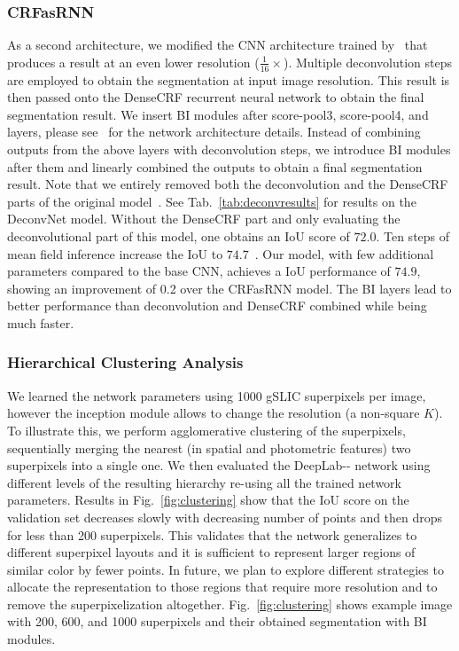\subsubsection{CRFasRNN}
As a second architecture, we modified the CNN architecture
trained by~\cite{zheng2015conditional} that
produces a result at an even lower resolution ($\frac{1}{16} \times$).
Multiple deconvolution steps are employed to obtain the segmentation at input
image resolution. This result is then passed onto the DenseCRF recurrent neural network
to obtain the final segmentation result.
We insert BI modules after score-pool3, score-pool4,  and  layers, please
see~\cite{long2014fully,zheng2015conditional} for the network architecture details.
Instead of combining outputs from the above layers with deconvolution steps, we introduce
BI modules after them and linearly combined the outputs to obtain a final segmentation result.
Note that we entirely removed both the deconvolution and the DenseCRF parts of the original model~\cite{zheng2015conditional}.
See Tab.~\ref{tab:deconvresults} for results on the DeconvNet model.
Without the DenseCRF part and only evaluating the deconvolutional part of this
model, one obtains an IoU score of $72.0$.
Ten steps of mean field inference increase the IoU to $74.7$~\cite{zheng2015conditional}. Our model, with few additional parameters compared to the base CNN,
achieves a IoU performance of $74.9$, showing an improvement of 0.2 over the CRFasRNN model.
The BI layers lead to better performance than deconvolution and DenseCRF combined while being much faster.

\subsubsection{Hierarchical Clustering Analysis}
We learned the network parameters using 1000 gSLIC superpixels per image, however the inception module allows to change the resolution (a non-square $K$).
To illustrate this, we perform agglomerative clustering of the superpixels, sequentially merging the nearest (in spatial and
photometric features) two superpixels into a single one.
We then evaluated the DeepLab-- network using different levels of the resulting hierarchy re-using all the trained network parameters.
Results in Fig.~\ref{fig:clustering} show that the IoU score on the validation set decreases slowly with decreasing number of points and then drops for less than 200 superpixels.
This validates that the network generalizes to different superpixel layouts and it is sufficient to represent larger regions of similar color by fewer points.
In future, we plan to explore different strategies to allocate the representation to those regions that require more resolution and to remove the superpixelization altogether.
Fig.~\ref{fig:clustering} shows example image with 200, 600, and 1000 superpixels and their obtained segmentation with BI modules.


